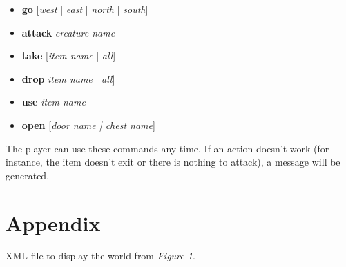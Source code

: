 \documentclass[dvips,12pt]{article}
\begin{document}
\begin{itemize}
	\item{\textbf{go} [\emph{west} | \emph{east} | \emph{north} | \emph{south}]}
	\item{\textbf{attack} \emph{creature name}}
	\item{\textbf{take} [\emph{item name} | \emph{all}]}
	\item{\textbf{drop} \emph{item name} | \emph{all}]}
	\item{\textbf{use} \emph{item name}}
	\item{\textbf{open} [\emph{\emph{door name} | \emph{chest name}}]}
\end{itemize}

The player can use these commands any time. If an action doesn't work (for instance, the item doesn't exit or there is nothing to attack), a message will be generated.

\section{Appendix}
\label{App:xml}

\begin{appendix}
XML file to display the world from \emph{Figure 1}.

\end{appendix}
\end{document}
